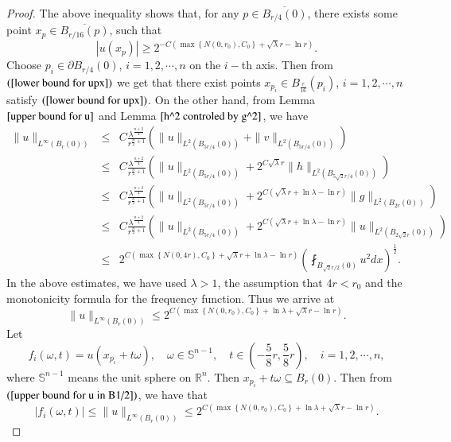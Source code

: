 \documentclass[a4paper, 12pt, onecolumn]{article} \textwidth 148mm
\begin{document}
\begin{proof}
The above inequality shows that, for any $p\in\overline{B_{r/4}(0)}$, there exists some point $x_p\in \overline{B_{r/16}(p)}$, such that
\begin{equation}\label{lower bound for upx}
|u(x_p)|\geq2^{-C(\max\left\{N(0,r_0),C_0\right\}+\sqrt{\lambda}r-\ln r)}.
\end{equation}
Choose $p_i\in\partial B_{r/4}(0)$, $i=1,2,\cdots, n$ on the $i-$th axis. Then from $(\ref{lower bound for upx})$ we get that there exist points $x_{p_i}\in B_{\frac{r}{16}}(p_i)$, $i=1,2,\cdots, n$ satisfy $(\ref{lower bound for upx})$. On the other hand, from Lemma $\ref{upper bound for u}$ and Lemma $\ref{h^2 controled by g^2}$, we have
\begin{eqnarray*}
\|u\|_{L^{\infty}(B_{r}(0))}
&\leq&C\frac{\lambda^{\frac{n+2}{4}}}{r^{\frac{n}{2}+1}}(\|u\|_{L^2(B_{5r/4}(0))}+\|v\|_{L^2(B_{5r/4}(0))})
\\&\leq&C\frac{\lambda^{\frac{n+2}{4}}}{r^{\frac{n}{2}+1}}(\|u\|_{L^2(B_{5r/4}(0))}
+2^{C\sqrt{\lambda}r}\|h\|_{L^2(B_{5\sqrt{2}r/4}(0))})
\\&\leq&C\frac{\lambda^{\frac{n+2}{4}}}{r^{\frac{n}{2}+1}}
(\|u\|_{L^2(B_{5r/4}(0))}+2^{C(\sqrt{\lambda}r+\ln\lambda-\ln r)}\|g\|_{L^2(B_{2r}(0))})
\\&\leq&C\frac{\lambda^{\frac{n+2}{4}}}{r^{\frac{n}{2}+1}}
(\|u\|_{L^2(B_{5r/4}(0))}+2^{C(\sqrt{\lambda}r+\ln\lambda-\ln r)}\|u\|_{L^2(B_{2\sqrt{2}r}(0))})
\\&\leq&2^{C(\max\left\{N(0,4r),C_0\right\}+\sqrt{\lambda}r+\ln\lambda-\ln r)}\left(\fint_{B_{\sqrt{2}r/2}(0)}u^2dx\right)^{\frac{1}{2}}.
\end{eqnarray*}
In the above estimates, we have used $\lambda>1$, the assumption that $4r<r_0$ and the monotonicity formula for the frequency function.
Thus we arrive at
\begin{equation}\label{upper bound for u in B1/2}
\|u\|_{L^{\infty}(B_{r}(0))}\leq 2^{C(\max\left\{N(0,r_0),C_0\right\}+\ln\lambda+\sqrt{\lambda}r-\ln r)}.
\end{equation}
Let
\begin{equation*}
f_i(\omega,t)=u(x_{p_i}+t\omega),\quad \omega\in\mathbb{S}^{n-1},\quad t\in(-\frac{5}{8}r,\frac{5}{8}r),\quad i=1,2,\cdots, n,
\end{equation*}
where $\mathbb{S}^{n-1}$ means the unit sphere on $\mathbb{R}^n$. Then $x_{p_i}+t\omega\subseteq B_r(0)$. Then from
$(\ref{upper bound for u in B1/2})$,
we have that
$$
|f_i(\omega,t)|\leq\|u\|_{L^{\infty}(B_{r}(0))}\leq 2^{C(\max\left\{N(0,r_0),C_0\right\}+\ln\lambda+\sqrt{\lambda}r-\ln r)}.
$$
\end{proof}
\end{document}
